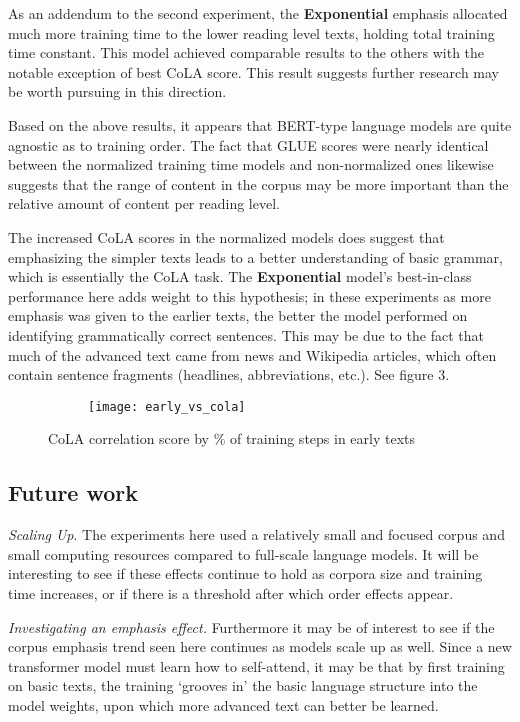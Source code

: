 \documentclass{article}
\begin{document}
As an addendum to the second experiment, the \textbf{Exponential} emphasis allocated much more training time to the lower reading level texts, holding total training time constant. This model achieved comparable results to the others with the notable exception of best CoLA score. This result suggests further research may be worth pursuing in this direction.

Based on the above results, it appears that BERT-type language models are quite agnostic as to training order. The fact that GLUE scores were nearly identical between the normalized training time models and non-normalized ones likewise suggests that the range of content in the corpus may be more important than the relative amount of content per reading level.

The increased CoLA scores in the normalized models does suggest that emphasizing the simpler texts leads to a better understanding of basic grammar, which is essentially the CoLA task. The \textbf{Exponential} model's best-in-class performance here adds weight to this hypothesis; in these experiments as more emphasis was given to the earlier texts, the better the model performed on identifying grammatically correct sentences. This may be due to the fact that much of the advanced text came from news and Wikipedia articles, which often contain sentence fragments (headlines, abbreviations, etc.). See figure 3.

\begin{figure}
\centering
\begin{subfigure}{1\textwidth}
  \centering
  \texttt{[image: early\_vs\_cola]}
  \label{fig:sub1}
\end{subfigure}
\caption{CoLA correlation score by \% of training steps in early texts}
\label{fig:test}
\end{figure}

\subsection{Future work}

\emph{Scaling Up}. The experiments here used a relatively small and focused corpus and small computing resources compared to full-scale language models. It will be interesting to see if these effects continue to hold as corpora size and training time increases, or if there is a threshold after which order effects appear.

\emph{Investigating an emphasis effect.} Furthermore it may be of interest to see if the corpus emphasis trend seen here continues as models scale up as well. Since a new transformer model must learn how to self-attend, it may be that by first training on basic texts, the training `grooves in' the basic language structure into the model weights, upon which more advanced text can better be learned.
\end{document}
